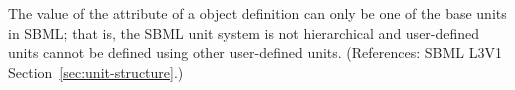 The value of the  attribute of a \Unit object definition can
only be one of the base units in SBML; that is, the SBML unit system is not
hierarchical and user-defined units cannot be defined using other
user-defined units.  (References: SBML L3V1
Section~\ref{sec:unit-structure}.)
